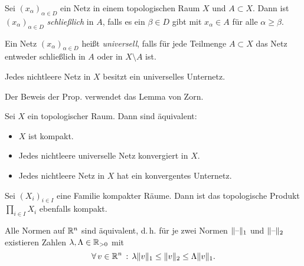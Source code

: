 \documentclass{cheat-sheet}
\begin{document}
\begin{defn}
  Sei $(x_\alpha)_{\alpha \in D}$ ein Netz in einem topologischen Raum $X$ und $A \subset X$. Dann ist $(x_\alpha)_{\alpha \in D}$ \emph{schließlich} in $A$, falls es ein $\beta \in D$ gibt mit $x_\alpha \in A$ für alle $\alpha \geq \beta$.
\end{defn}


\begin{defn}
  Ein Netz $(x_\alpha)_{\alpha \in D}$ heißt \emph{universell}, falls für jede Teilmenge $A \subset X$ das Netz entweder schließlich in $A$ oder in $X \setminus A$ ist.
\end{defn}


\begin{prop}
  Jedes nichtleere Netz in $X$ besitzt ein universelles Unternetz.
\end{prop}

\begin{bem}
  Der Beweis der Prop. verwendet das Lemma von Zorn.
\end{bem}

\begin{satz}
  Sei $X$ ein topologischer Raum. Dann sind äquivalent:
  \begin{itemize}
    \item $X$ ist kompakt.
    \item Jedes nichtleere universelle Netz konvergiert in $X$.
    \item Jedes nichtleere Netz in $X$ hat ein konvergentes Unternetz.
  \end{itemize}
\end{satz}

\begin{satz}[Tychonoff]
  Sei $(X_i)_{i \in I}$ eine Familie kompakter Räume. Dann ist das topologische Produkt $\prod_{i \in I} X_i$ ebenfalls kompakt.
\end{satz}


\begin{lem}
  Alle Normen auf $\mathbb{R}^n$ sind äquivalent, d.\,h. für je zwei Normen $\lVert\text{--}\rVert_1$ und $\lVert\text{--}\rVert_2$ existieren Zahlen $\lambda, \Lambda \in \mathbb{R}_{> 0}$ mit
  \[ \forall \, {v \in \mathbb{R}^n} \,:\, \lambda \lVert v\rVert_1 \leq \lVert v\rVert_2 \leq \Lambda \lVert v\rVert_1. \]
\end{lem}
\end{document}
